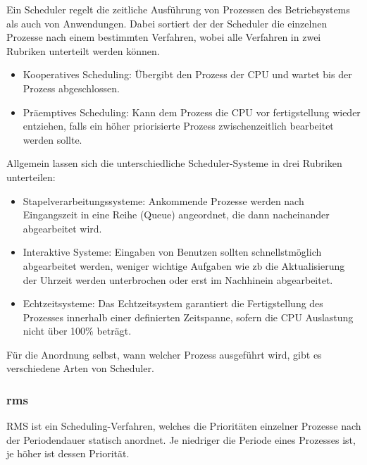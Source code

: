 \documentclass[../EDF Master Thesis.tex]{subfiles}
\begin{document}
Ein Scheduler regelt die zeitliche Ausführung von Prozessen des Betriebsystems als auch von Anwendungen.
Dabei sortiert der der Scheduler die einzelnen Prozesse nach einem bestimmten Verfahren, wobei alle Verfahren in zwei Rubriken unterteilt werden können.
\begin{itemize}
    \item Kooperatives Scheduling: Übergibt den Prozess der CPU und wartet bis der Prozess abgeschlossen.
    \item Präemptives Scheduling: Kann dem Prozess die CPU vor fertigstellung wieder entziehen, falls ein höher priorisierte Prozess zwischenzeitlich bearbeitet werden sollte.
\end{itemize}
Allgemein lassen sich die unterschiedliche Scheduler-Systeme in drei Rubriken unterteilen:
\begin{itemize}
    \item Stapelverarbeitungssysteme: Ankommende Prozesse werden nach Eingangszeit in eine Reihe (Queue) angeordnet, die dann nacheinander abgearbeitet wird.
    \item Interaktive Systeme: Eingaben von Benutzen sollten schnellstmöglich abgearbeitet werden, weniger wichtige Aufgaben wie \ac{zb} die Aktualisierung der Uhrzeit werden unterbrochen oder erst im Nachhinein abgearbeitet.
    \item Echtzeitsysteme: Das Echtzeitsystem garantiert die Fertigstellung des Prozesses innerhalb einer definierten Zeitspanne, sofern die CPU Auslastung nicht über 100\% beträgt.
\end{itemize}
Für die Anordnung selbst, wann welcher Prozess ausgeführt wird, gibt es verschiedene Arten von Scheduler.


\subsubsection{\ac{rms}}
    RMS ist ein Scheduling-Verfahren, welches die Prioritäten einzelner Prozesse nach der Periodendauer statisch anordnet.
    Je niedriger die Periode eines Prozesses ist, je höher ist dessen Priorität. \parencite{wiki:004}
\end{document}
